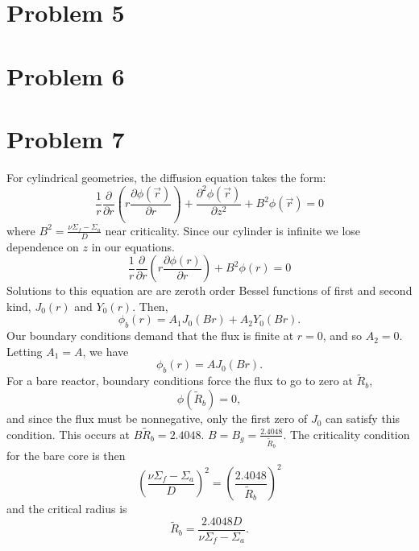 \documentclass{article}
\newcommand{\p}{\partial}
\newcommand{\Xs}{\Sigma}
\newcommand{\pos}{\vec{r}}
\begin{document}

\section*{Problem 5}





\section*{Problem 6}





\section*{Problem 7}

For cylindrical geometries, the diffusion equation takes the form:
$$ \frac{1}{r}\frac{\p}{\p r}\left(r \frac{\p \phi(\pos)}{\p r}\right) + \frac{\p^2 \phi(\pos)}{\p z^2} + B^2\phi(\pos) = 0$$
where $B^2 = \frac{\nu\Sigma_f - \Sigma_a}{D} $ near criticality. 
Since our cylinder is infinite we lose dependence on $z$ in our equations.
$$ \frac{1}{r}\frac{\p}{\p r}\left(r \frac{\p \phi(r)}{\p r}\right) + B^2\phi(r) = 0$$
Solutions to this equation are are zeroth order Bessel functions of first and second kind, $J_0(r)$ and $Y_0(r)$. 
Then,
$$ \phi_b(r) = A_1 J_0(B r) + A_2 Y_0(B r) .$$
Our boundary conditions demand that the flux is finite at $r = 0$, and so $A_2 = 0$. 
Letting $A_1 = A$, we have
$$ \phi_b(r) = A J_0(B r) .$$
For a bare reactor, boundary conditions force the flux to go to zero at $\tilde{R}_b$,
$$ \phi(\tilde{R}_b) = 0 ,$$
and since the flux must be nonnegative, only the first zero of $J_0$ can satisfy this condition. This occurs at $B \tilde{R}_b = 2.4048$. $B = B_g = \frac{2.4048}{\tilde{R}_b}$. The criticality condition for the bare core is then 
$$ \left(\frac{\nu\Xs_f - \Xs_a}{D}\right)^2 = \left(\frac{2.4048}{\tilde{R}_b}\right)^2 $$
and the critical radius is
$$ \tilde{R}_b = \frac{2.4048 D}{\nu\Sigma_f - \Sigma_a} .$$
\end{document}
